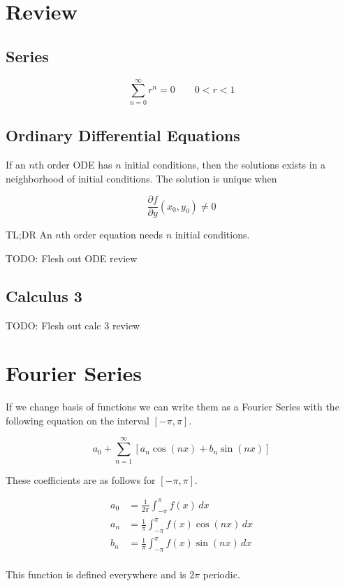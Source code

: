 \section{Review}

    \subsection{Series}

    \[
        \sum_{n=0}^\infty r^n = 0 \qquad 0 < r < 1
    \]

    \subsection{Ordinary Differential Equations}

    \begin{thm}
        If an $n$th order ODE has $n$ initial conditions, then the solutions exists in a neighborhood of initial conditions.
        The solution is unique when

        \[
            \frac{\partial f}{\partial y}(x_0, y_0) \neq 0
        \]

        TL;DR An $n$th order equation needs $n$ initial conditions.
    \end{thm}

    TODO: Flesh out ODE review

    \subsection{Calculus 3}

    TODO: Flesh out calc 3 review

\section{Fourier Series}

\begin{thm}
    If we change basis of functions we can write them as a Fourier Series with the following equation on the interval
    $[-\pi, \pi]$.

    \begin{equation}
    a_0 + \sum_{n=1}^\infty \left[ a_n \cos(nx) + b_n \sin(nx) \right]
    \end{equation}

    These coefficients are as follows for $[-\pi, \pi]$.

    \begin{align*}
        a_0 &= \frac{1}{2\pi} \int_{-\pi}^\pi f(x) \, dx\\
        a_n &= \frac{1}{\pi} \int_{-\pi}^\pi f(x) \cos(nx) \, dx\\
        b_n &= \frac{1}{\pi} \int_{-\pi}^\pi f(x) \sin(nx) \, dx\\
    \end{align*}

    This function is defined everywhere and is $2\pi$ periodic.
\end{thm}

